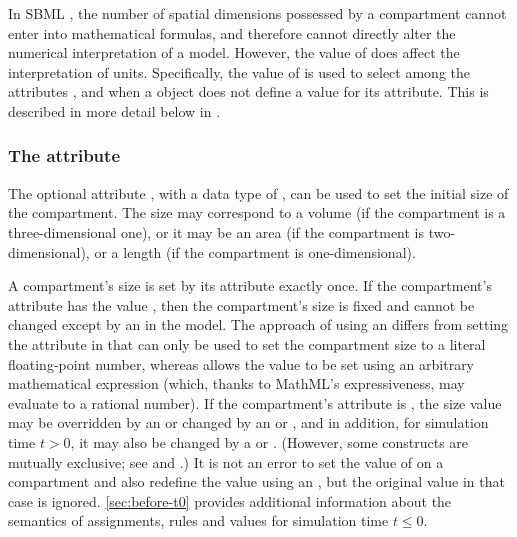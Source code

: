 In SBML \thisLV, the number of spatial dimensions possessed by a
compartment cannot enter into mathematical formulas, and therefore
cannot directly alter the numerical interpretation of a model.
However, the value of  does affect the
interpretation of units.  Specifically, the value of
 is used to select among the \Model
attributes ,  and
 when a \Compartment object does not define a
value for its  attribute.  This is described in more
detail below in .


\subsubsection{The  attribute}
\label{sec:compartment-size}
\label{sec:size}

The optional \Compartment attribute , with a data type
of , can be used to set the initial size of the
compartment.  The size may correspond to a volume (if the
compartment is a three-dimensional one), or it may be an area (if
the compartment is two-dimensional), or a length (if the
compartment is one-dimensional).

A compartment's size is set by its  attribute exactly
once.  If the compartment's attribute  has
the value , then the compartment's size is fixed
and cannot be changed except by an \InitialAssignment in the
model.  The approach of using an \InitialAssignment differs from
setting the  attribute in that  can only
be used to set the compartment size to a literal floating-point
number, whereas \InitialAssignment allows the value to be set
using an arbitrary mathematical expression (which, thanks to
MathML's expressiveness, may evaluate to a rational number).  If
the compartment's  attribute is , the
size value may be overridden by an \InitialAssignment or changed
by an \AssignmentRule or \AlgebraicRule, and in addition, for
simulation time $t > 0$, it may also be changed by a \RateRule or
\Event.  (However, some constructs are mutually exclusive; see
 and .)  It is not an
error to set the value of  on a compartment and also
redefine the value using an \InitialAssignment, but the original
 value in that case is ignored.
\ref{sec:before-t0} provides additional information about
the semantics of assignments, rules and values for simulation time
$t \leq 0$.


